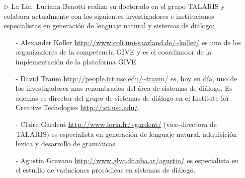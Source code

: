 \begin{itemize}
\item[$\triangleright$] La Lic.\ Luciana Benotti realiza su doctorado en el
grupo TALARIS y colabora actualmente con los siguientes investigadores e instituciones
especialistas en generaci\'on de lenguaje natural y sistemas de di\'alogo:
\begin{itemize}
    \item[-]  Alexander Koller \url{http://www.coli.uni-saarland.de/~koller/} es uno de los organizadores 
de la competencia GIVE y es el coordinador de la implementaci\'on de la plataforma GIVE.
    \item[-] David Traum \url{http://people.ict.usc.edu/~traum/} es, hoy en d\'ia, uno
de los investigadores mas renombrados del \'area de sistemas de di\'alogo.
Es adem\'as es director del grupo de sistemas de di\'alogo en el Institute
for Creative Techologies \url{http://ict.usc.edu/}.
\item[-] Claire Gardent \url{http://www.loria.fr/~gardent/} (vice-directora de
TALARIS) es especialista en generaci\'on de lenguaje natural, adquisici\'on
lexica y desarrollo de gram\'aticas.
\item[-] Agust\'in Gravano \url{http://www.glyc.dc.uba.ar/agustin/} es especialista
en el estudio de varia\-ciones pros\'odicas en sistemas de di\'alogo.

\end{itemize}
\end{itemize}



